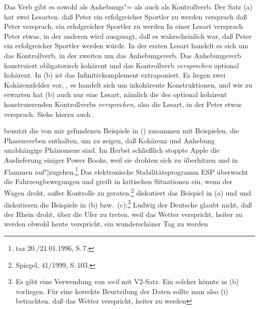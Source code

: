 Das Verb  gibt es sowohl als Anhebungs"= als auch als Kontrollverb. Der Satz
(a) hat zwei Lesarten. 
\eal
\label{bsp-kontrast-raising-extraposition}
\ex
daß Peter ein erfolgreicher Sportler zu werden versprach
\ex\label{ex-versprach-ein-x-zu-werden} 
daß Peter versprach, ein erfolgreicher Sportler zu werden
\zl
In einer Lesart versprach Peter etwas, in der anderen
wird ausgesagt, daß es wahrscheinlich war, daß Peter ein erfolgreicher
Sportler werden würde. In der ersten Lesart handelt es sich um das Kontrollverb, in der
zweiten um das Anhebungsverb.
Das Anhebungsverb konstruiert obligatorisch kohärent und das Kontrollverb
\emph{versprechen} optional kohärent. In (b) ist das Infinitivkomplement extraponiert.
Es liegen zwei Kohärenzfelder vor, \dash, es handelt sich um inkohärente Konstruktionen, 
und wie zu erwarten hat (b) auch nur eine Lesart, nämlich die des optional kohärent
konstruierenden Kontrollverbs \emph{versprechen}, also die Lesart, in der
Peter etwas versprach. Siehe hierzu auch .

\citet[]{Meurers2000b} benutzt die von mir gefundenen Beispiele 
in () zusammen mit Beispielen, die Phasenverben enthalten, um zu zeigen,
daß Kohärenz und Anhebung unabhängige Phänomene sind.
\eal{}
\ex 
Im Herbst schließlich stoppte Apple die Auslieferung einiger Power Books, weil sie drohten
     sich zu überhitzen und in Flammen auf"|zugehen.\footnote{
         taz 20./21.01.1996, S.\,7.
    }
\ex
Das elektronische Stabilitätsprogramm ESP überwacht die Fahrzeugbewegungen und greift 
     in kritischen Situationen ein, wenn der Wagen droht, außer Kontrolle zu geraten.\footnote{
        Spiegel, 41/1999, S.\,103.
    }
\zl
\citet[]{Fanselow87a} diskutiert das Beispiel in 
(a) und \citet[]{Rosengren92a} und
\citet[]{Cook2001a} diskutieren die Beispiele in (b) bzw.\ (c):\footnote{
  Es gibt eine Verwendung von \emph{weil} mit V2-Satz. Ein solcher könnte in
  (b) vorliegen. Für eine korrekte Beurteilung der Daten sollte man also
  (i) betrachten.
  \ea
  daß das Wetter verspricht, heiter zu werden
  \zlast
}
\eal
\ex Ludwig der Deutsche glaubt nicht, daß der Rhein droht, über die Ufer zu treten.
\ex weil das Wetter verspricht, heiter zu werden
\ex obwohl heute verspricht, ein wunderschöner Tag zu werden
\zl


